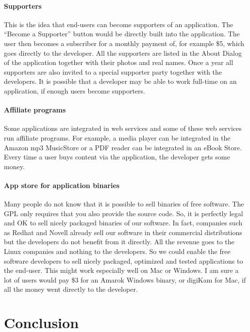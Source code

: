 \paragraph*{Supporters}

This is the idea that end-users can become supporters of an application. The
``Become a Supporter'' button would be directly built into the application. The
user then becomes a subscriber for a monthly payment of, for example \$5, which
goes directly to the developer. All the supporters are listed in the About
Dialog of the application together with their photos and real names. Once a year
all supporters are also invited to a special supporter party together with the
developers. It is possible that a developer may be able to work full-time on an
application, if enough users become supporters.

\paragraph*{Affiliate programs}

Some applications are integrated in web services and some of these web services
run affiliate programs. For example, a media player can be integrated in the
Amazon mp3 MusicStore or a PDF reader can be integrated in an eBook Store.
Every time a user buys content via the application, the developer gets some
money.

\paragraph*{App store for application binaries}

Many people do not know that it is possible to sell binaries of free software.
The GPL only requires that you also provide the source code. So, it is perfectly
legal and OK to sell nicely packaged binaries of our software. In fact,
companies such as Redhat and Novell already sell our software in their commercial
distributions but the developers do not benefit from it directly. All the
revenue goes to the Linux companies and nothing to the developers. So we could
enable the free software developers to sell nicely packaged, optimized and
tested applications to the end-user. This might work especially well on Mac or
Windows. I am sure a lot of users would pay \$3 for an Amarok Windows binary, or
digiKam for Mac, if all the money went directly to the developer.

\section*{Conclusion}

